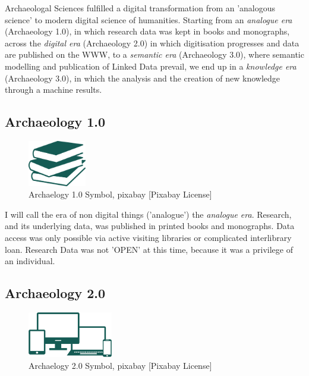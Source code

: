 \documentclass[twocolumn]{autart}
\begin{document}
Archaeologal Sciences fulfilled a digital transformation from an 'analogous science' to modern digital science of humanities. Starting from an \textit{analogue era} (Archaeology 1.0), in which research data was kept in books and monographs, across the \textit{digital era} (Archaeology 2.0) in which digitisation progresses and data are published on the WWW, to a \textit{semantic era} (Archaeology 3.0), where semantic modelling and publication of Linked Data prevail, we end up in a \textit{knowledge era} (Archaeology 3.0), in which the analysis and the creation of new knowledge through a machine results.

\subsection{Archaeology 1.0}

\begin{figure}[!htb]
\begin{center}
\includegraphics[height=2cm]{a10.png}   
\caption{Archaelogy 1.0 Symbol, pixabay [Pixabay License]} 
\label{figa10symbol}                               
\end{center}                        
\end{figure}

I will call the era of non digital things ('analogue') the \textit{analogue era}. Research, and its underlying data, was published in printed books and monographs. Data access was only possible via active visiting libraries or complicated interlibrary loan. Research Data was not 'OPEN' at this time, because it was a privilege of an individual. 

\subsection{Archaeology 2.0}

\begin{figure}[!htb]
\begin{center}
\includegraphics[height=2cm]{a20.png}
\caption{Archaelogy 2.0 Symbol, pixabay [Pixabay License]}
\label{figa20symbol}                                 
\end{center}                                
\end{figure}
\end{document}
